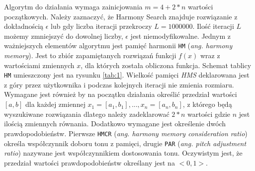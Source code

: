 \documentclass[10pt, a4paper]{article}
\begin{document}
Algorytm do działania wymaga zainicjowania {\em $m=4+2*n$} wartości początkowych. Należy zaznaczyć, że Harmony Search znajduje rozwiązanie z dokładnością {\em $\epsilon$} lub gdy liczba iteracji przekroczy {\em $L=1000000$}. Ilość iteracji {\em $L$} możemy zmniejszyć do dowolnej liczby, {\em $\epsilon$} jest niemodyfikowalne. Jednym z ważniejszych elementów algorytmu jest pamięć harmonii {\tt HM} ({\em ang. harmony memory}). Jest to zbiór zapamiętanych rozwiązań funkcji $f(x)$ wraz z wartościami zmiennych $x$, dla których została obliczona funkcja. Schemat tablicy {\tt HM} umieszczony jest na rysunku \ref{tab:1}. Wielkość pamięci {\em HMS} deklarowana jest z góry przez użytkownika i podczas kolejnych iteracji nie zmienia rozmiaru. Wymagane jest również by na początku działania określić przedział wartości $[a,b]$ dla każdej zmiennej $x_{1}=[a_{1},b_{1}], ... ,x_{n}=[a_{n},b_{n}]$, z którego będą wyszukiwane rozwiązania dlatego należy zadeklarować $2*n$ wartości gdzie $n$ jest ilością zmiennych równania. Dodatkowo wymagane jest określenie dwóch prawdopodobieństw. Pierwsze {\tt HMCR} ({\em ang. harmony memory consideration ratio}) określa współczynnik doboru tonu z pamięci, drugie {\tt PAR} ({\em ang. pitch adjustment ratio}) nazywane jest współczynnikiem dostosowania tonu. Oczywistym jest, że przedział wartości prawdopodobieństw określany jest na $<0,1>$.
\end{document}
